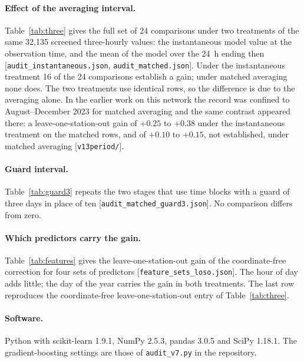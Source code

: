 \documentclass[11pt]{article}
\begin{document}
\paragraph{Effect of the averaging interval.} Table~\ref{tab:three} gives the full set of 24
comparisons under two treatments of the same 32,135 screened three-hourly values: the
instantaneous model value at the observation time, and the mean of the model over the 24~h ending
then [\texttt{audit\_instantaneous.json}, \texttt{audit\_matched.json}]. Under the instantaneous
treatment 16 of the 24 comparisons establish a gain; under matched averaging none does. The two
treatments use identical rows, so the difference is due to the averaging alone. In the earlier
work on this network the record was confined to August--December 2023 for matched averaging and
the same contrast appeared there: a leave-one-station-out gain of $+0.25$ to $+0.38$ under the
instantaneous treatment on the matched rows, and of $+0.10$ to $+0.15$, not established, under
matched averaging [\texttt{v13period/}].

\paragraph{Guard interval.} Table~\ref{tab:guard3} repeats the two stages that use time blocks
with a guard of three days in place of ten [\texttt{audit\_matched\_guard3.json}]. No comparison
differs from zero.

\paragraph{Which predictors carry the gain.} Table~\ref{tab:features} gives the
leave-one-station-out gain of the coordinate-free correction for four sets of predictors
[\texttt{feature\_sets\_loso.json}]. The hour of day adds little; the day of the year carries
the gain in both treatments. The last row reproduces the coordinate-free leave-one-station-out
entry of Table~\ref{tab:three}.

\paragraph{Software.} Python with scikit-learn 1.9.1, NumPy 2.5.3, pandas 3.0.5 and SciPy
1.18.1. The gradient-boosting settings are those of \texttt{audit\_v7.py} in the repository.

\begin{table}\centering\footnotesize
\caption{Median $\Delta$, number of monitors improved and Benjamini--Hochberg $q$ for the 24
comparisons under two treatments of the averaging interval, on the same values.}
\label{tab:three}
\resizebox{0.75\textheight}{!}{}
\end{table}
\end{document}
